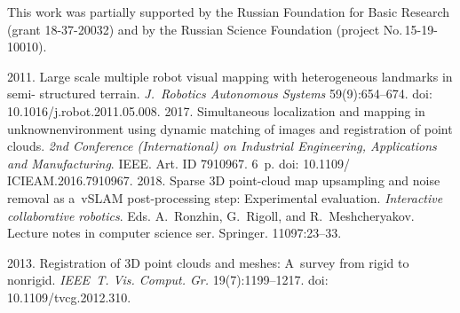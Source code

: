 



\vspace*{-6pt}

\Ack
\noindent
This work was partially supported by the Russian Foundation for Basic Research 
(grant 18-37-20032) and by the Russian Science Foundation (project  
No.\,15-19-10010).

\vspace*{9pt}

  \begin{multicols}{2}

\renewcommand{\bibname}{\protect\rmfamily References}

{\small\frenchspacing
 {%
 \begin{thebibliography}{99}
 
 2011. Large 
scale multiple robot visual mapping with heterogeneous landmarks in semi-
structured terrain. \textit{J.~Robotics Autonomous Systems} 59(9):654--674. doi: 
10.1016/j.robot.2011.05.008.
 2017. Simultaneous 
localization and mapping in unknown\linebreak environment using dynamic matching of 
images and registration of point clouds. \textit{2nd  Conference 
(International) on Industrial Engineering, Applications and Manufacturing}. 
IEEE. Art. 
ID 7910967. 6~p. doi: 10.1109/ ICIEAM.2016.7910967.
 2018. Sparse 3D point-cloud map 
upsampling and noise removal as a~vSLAM post-processing step: Experimental 
evaluation. \textit{Interactive collaborative 
robotics}. Eds. A.~Ronzhin, G.~Rigoll, and R.~Meshcheryakov.
Lecture notes in computer science ser. Springer. 11097:23--33.

 2013. Registration of 3D point clouds and meshes: 
A~survey from rigid to nonrigid. \textit{IEEE~T. Vis. Comput. Gr.}  
19(7):1199--1217. doi: 10.1109/tvcg.2012.310.


\end{thebibliography}}}
\end{multicols}
